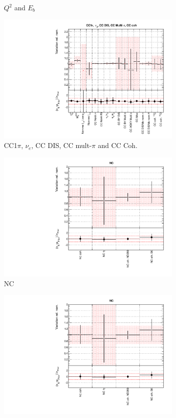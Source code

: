 \begin{figure}[!htbp]
\begin{subfigure}{0.49\textwidth}
  \caption{$Q^2$ and $E_b$}
\end{subfigure}
\begin{subfigure}{0.49\textwidth}
  \centering
  \includegraphics[width=0.9\linewidth]{figs/asmvxsecpoly3}
  \caption{CC1$\pi$, $\nu_e$, CC DIS, CC mult-$\pi$ and CC Coh.}
\end{subfigure}
\begin{subfigure}{0.49\textwidth}
  \centering
  \includegraphics[width=0.9\linewidth]{figs/asmvxsecpoly4}
  \caption{NC}
\end{subfigure}
\begin{subfigure}{0.49\textwidth}
  \centering
  \includegraphics[width=0.9\linewidth]{figs/asmvxsecpoly4}

\end{subfigure}
\end{figure}
